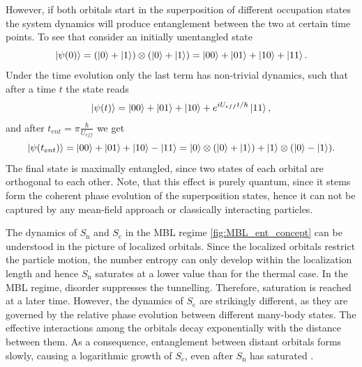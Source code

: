 However, if both orbitals start in the superposition of different occupation states the system dynamics will produce entanglement between the two at certain time points. To see that consider an initially unentangled state 
\begin{equation}
\left|\psi(0)\right\rangle = (\left|0\right\rangle+\left|1\right\rangle)\otimes(\left|0\right\rangle+\left|1\right\rangle) = \left|00\right\rangle+\left|01\right\rangle+\left|10\right\rangle+\left|11\right\rangle.
\end{equation}
Under the time evolution only the last term has non-trivial dynamics, such that after a time $t$ the state reads
\begin{equation}
\left|\psi(t)\right\rangle = \left|00\right\rangle+\left|01\right\rangle+\left|10\right\rangle+e^{iU_{eff}t/\hbar}\left|11\right\rangle,
\end{equation}
and after $t_{ent}=\pi \frac{\hbar}{U_{eff}}$ we get
\begin{equation}
\left|\psi(t_{ent})\right\rangle = \left|00\right\rangle+\left|01\right\rangle+\left|10\right\rangle-\left|11\right\rangle = \left|0\right\rangle\otimes(\left|0\right\rangle+\left|1\right\rangle)+\left|1\right\rangle\otimes(\left|0\right\rangle -\left|1\right\rangle).
\end{equation}
The final state is maximally entangled, since two states of each orbital are orthogonal to each other. Note, that this effect is purely quantum, since it stems form the coherent phase evolution of the superposition states, hence it can not be captured by any mean-field approach or classically interacting particles.

The dynamics of $S_\text{n}$ and $S_\text{c}$ in the MBL regime \ref{fig:MBL_ent_concept} can be understood in the picture of localized orbitals. Since the localized orbitals restrict the particle motion, the number entropy can only develop within the localization length and hence $S_\text{n}$ saturates at a lower value than for the thermal case. In the MBL regime, disorder suppresses the tunnelling. Therefore, saturation is reached at a later time. However, the dynamics of $S_\text{c}$ are strikingly different, as they are governed by the relative phase evolution between different many-body states.  The effective interactions among the orbitals decay exponentially with the distance between them. As a consequence, entanglement between distant orbitals forms slowly, causing a logarithmic growth of $S_\text{c}$, even after $S_\text{n}$ has saturated \cite{Serbyn2013, Serbyn2013b, Huse2014, Znidaric2008, Bardarson2012}.

